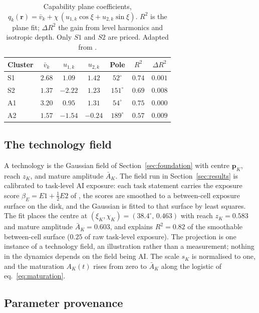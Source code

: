 \documentclass[12pt, a4paper]{article}
\newcommand{\rr}{\mathbf{r}}
\begin{document}
\begin{table}[tbp]
\centering
\caption{Capability plane coefficients,
$q_k(\rr) = \bar v_k + \chi\,(u_{1,k}\cos\xi + u_{2,k}\sin\xi)$.
$R^2$ is the plane fit; $\Delta R^2$ the gain from level harmonics and
isotropic depth. Only $S1$ and $S2$ are priced. Adapted from
\textcite{storck2026fields}.}
\label{tab:planes}
\begin{tabular}{lcccccc}
\toprule
Cluster & $\bar v_k$ & $u_{1,k}$ & $u_{2,k}$ & Pole & $R^2$ & $\Delta R^2$ \\
\midrule
S1 & $2.68$ & $1.09$ & $1.42$ & $52^\circ$ & $0.74$ & $0.001$ \\
S2 & $1.37$ & $-2.22$ & $1.23$ & $151^\circ$ & $0.69$ & $0.008$ \\
A1 & $3.20$ & $0.95$ & $1.31$ & $54^\circ$ & $0.75$ & $0.000$ \\
A2 & $1.57$ & $-1.54$ & $-0.24$ & $189^\circ$ & $0.57$ & $0.009$ \\
\bottomrule
\end{tabular}
\end{table}

\subsection*{The technology field}

A technology is the Gaussian field of Section~\ref{sec:foundation} with
centre $\mathbf p_K$, reach $z_K$, and mature amplitude $\bar A_K$. The
field run in Section~\ref{sec:results} is calibrated to task-level AI
exposure: each task statement carries the exposure score
$\beta_E = E1 + \tfrac12 E2$ of \textcite{eloundou2024}, the scores are
smoothed to a between-cell exposure surface on the disk, and the
Gaussian is fitted to that surface by least squares. The fit places the
centre at $(\xi_K, \chi_K) = (38.4^\circ,\, 0.463)$ with reach
$z_K = 0.583$ and mature amplitude $\bar A_K = 0.603$, and explains
$R^2 = 0.82$ of the smoothable between-cell surface ($0.25$ of raw
task-level exposure). The projection is one instance of a technology
field, an illustration rather than a measurement; nothing in the
dynamics depends on the field being AI. The scale $s_K$ is normalised
to one, and the maturation $A_K(t)$ rises from zero to $\bar A_K$ along
the logistic of eq.~\eqref{eq:maturation}.

\subsection*{Parameter provenance}
\end{document}
